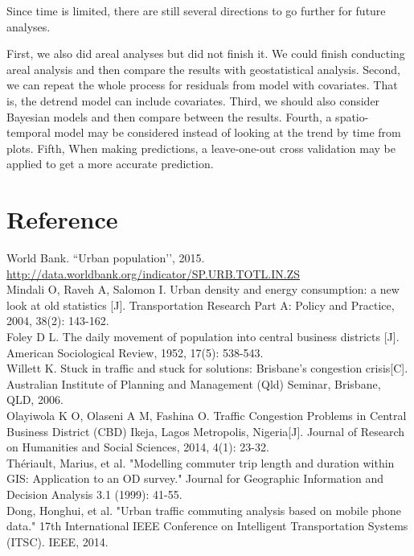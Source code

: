 \documentclass[hidelinks,12pt]{article}
\begin{document}
	Since time is limited, there are still several directions to go further for future analyses.
	
	 First, we also did areal analyses but did not finish it. We could finish conducting areal analysis and then compare the results with geostatistical analysis.	Second, we can repeat the whole process for residuals from model with covariates. That is, the detrend model can include covariates.	Third, we should also consider Bayesian models and then compare between the results. Fourth, a spatio-temporal model may be considered instead of looking at the trend by time from plots. Fifth, When making predictions, a leave-one-out cross validation may be applied to get a more accurate prediction.
		
	\section{Reference}\label{sec:ref}
	\noindent World Bank. “Urban population’’, 2015.\\
	\url{http://data.worldbank.org/indicator/SP.URB.TOTL.IN.ZS}\\
	
	\noindent Mindali O, Raveh A, Salomon I. Urban density and energy consumption: a new look at old statistics [J]. Transportation Research Part A: Policy and Practice, 2004, 38(2): 143-162.\\
	
	\noindent Foley D L. The daily movement of population into central business districts [J]. American Sociological Review, 1952, 17(5): 538-543.\\
	
	\noindent Willett K. Stuck in traffic and stuck for solutions: Brisbane’s congestion crisis[C]. Australian Institute of Planning and Management (Qld) Seminar, Brisbane, QLD, 2006.\\
	
	\noindent Olayiwola K O, Olaseni A M, Fashina O. Traffic Congestion Problems in Central Business District (CBD) Ikeja, Lagos Metropolis, Nigeria[J]. Journal of Research on Humanities and Social Sciences, 2014, 4(1): 23-32.\\
	
	\noindent Thériault, Marius, et al. "Modelling commuter trip length and duration within GIS: Application to an OD survey." Journal for Geographic Information and Decision Analysis 3.1 (1999): 41-55.\\
	
	\noindent Dong, Honghui, et al. "Urban traffic commuting analysis based on mobile phone data." 17th International IEEE Conference on Intelligent Transportation Systems (ITSC). IEEE, 2014.\\
	
\end{document}
